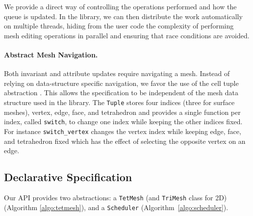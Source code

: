 We provide a direct way of controlling the operations performed and how the queue is updated. In the library, we can then distribute the work automatically on multiple threads, hiding from the user code the complexity of performing mesh editing operations in parallel and ensuring that race conditions are avoided. 

\paragraph{Abstract Mesh Navigation.}
Both invariant and attribute updates require navigating a mesh. Instead of relying on data-structure specific navigation, we favor the use of the cell tuple abstraction \cite{Brisson1989}. This allows the specification to be independent of the mesh data structure used in the library. The \texttt{Tuple} stores four indices  (three for surface meshes), vertex, edge, face, and tetrahedron and provides a single function per index, called \texttt{switch}, to change one index while keeping the other indices fixed. For instance \texttt{switch\_vertex} changes the vertex index while keeping edge, face, and tetrahedron fixed which has the effect of selecting the opposite vertex on an edge.

\subsection{Declarative Specification}


Our API provides two abstractions: a \texttt{TetMesh} (and \texttt{TriMesh} class for 2D) (Algorithm \ref{algo:tetmesh}), and a \texttt{Scheduler} (Algorithm~\ref{algo:scheduler}).

\begin{algorithm}
\inputminted{cpp}{wmtk-tex/code/tetmesh.cpp}
\caption{API of our \texttt{TetMesh} class.}
\label{algo:tetmesh}
\end{algorithm}



